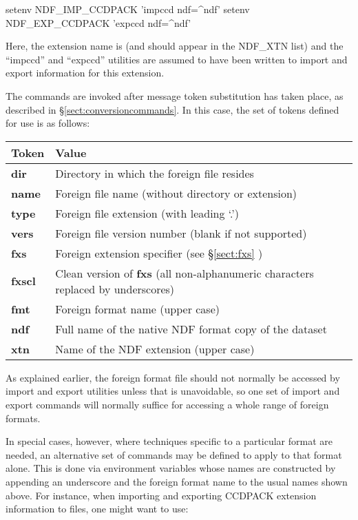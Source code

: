 \documentclass[11pt,twoside,nolof]{starlink}
\begin{document}
\begin{terminalv}
setenv NDF_IMP_CCDPACK 'impccd ndf=^ndf'
setenv NDF_EXP_CCDPACK 'expccd ndf=^ndf'
\end{terminalv}

Here, the extension name is  (and should
appear in the NDF\_XTN list) and the ``impccd'' and ``expccd''
utilities are assumed to have been written to import and export
information for this extension.

The commands are invoked after message token substitution has taken
place, as described in \S\ref{sect:conversioncommands}. In this case,
the set of tokens defined for use is as follows:

\begin{center}
\begin{tabular}{|l|l|}
\hline
\textbf{Token} & \textbf{Value}\\
\hline\hline
\textbf{dir}  & Directory in which the foreign file resides\\
\textbf{name} & Foreign file name (without directory or extension)\\
\textbf{type} & Foreign file extension (with leading `.')\\
\textbf{vers} & Foreign file version number (blank if not supported)\\
\textbf{fxs}  & Foreign extension specifier (see \S\ref{sect:fxs} )\\
\textbf{fxscl} & Clean version of \textbf{fxs} (all non-alphanumeric characters
replaced by underscores)\\
\textbf{fmt}  & Foreign format name (upper case)\\
\textbf{ndf}  & Full name of the native NDF format copy of the dataset\\
\textbf{xtn}  & Name of the NDF extension (upper case)\\
\hline
\end{tabular}
\end{center}

As explained earlier, the foreign format file should not normally be
accessed by import and export utilities unless that is unavoidable, so
one set of import and export commands will normally suffice for
accessing a whole range of foreign formats.

In special cases, however, where techniques specific to a particular
format are needed, an alternative set of commands may be defined to
apply to that format alone.  This is done via environment variables
whose names are constructed by appending an underscore and the foreign
format name to the usual names shown above. For instance, when
importing and exporting CCDPACK extension information to
 files, one might want to use:
\end{document}
